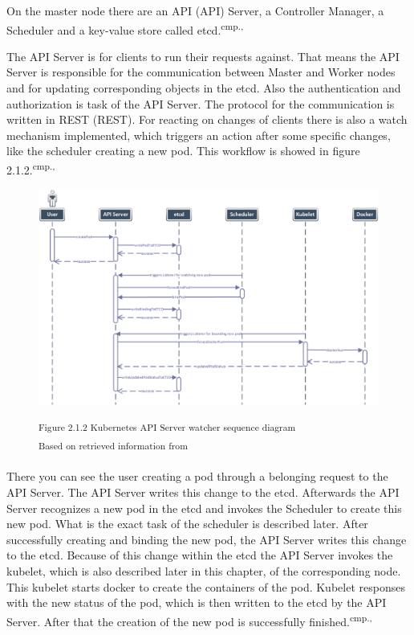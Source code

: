 On the master node there are an \acs{API} (\acl{API}) Server, a Controller Manager, a Scheduler and a key-value store called etcd.\textsuperscript{cmp.\cite{19}, \cite{22}}

The API Server is for clients to run their requests against. That means the API Server is responsible for the communication between Master and Worker nodes and for updating corresponding objects in the etcd. Also the authentication and authorization is task of the API Server. The protocol for the communication is written in \acs{REST} (\acl{REST}). For reacting on changes of clients there is also a watch mechanism implemented, which triggers an action after some specific changes, like the scheduler creating a new pod. This workflow is showed in figure 2.1.2.\textsuperscript{cmp.\cite{19}, \cite{22}}

\begin{figure}[h]
\centering
\includegraphics[width=\textwidth]{images/kubernetes_watcher_sequence.png}

\textsuperscript{Figure 2.1.2 Kubernetes API Server watcher sequence diagram}\\
\textsuperscript{Based on retrieved information from \cite{22}}
\end{figure}

There you can see the user creating a pod through a belonging request to the API Server. The API Server writes this change to the etcd. Afterwards the API Server recognizes a new pod in the etcd and invokes the Scheduler to create this new pod. What is the exact task of the scheduler is described later. After successfully creating and binding the new pod, the API Server writes this change to the etcd. Because of this change within the etcd the API Server invokes the kubelet, which is also described later in this chapter, of the corresponding node. This kubelet starts docker to create the containers of the pod. Kubelet responses with the new status of the pod, which is then written to the etcd by the API Server. After that the creation of the new pod is successfully finished.\textsuperscript{cmp.\cite{19}, \cite{22}}

